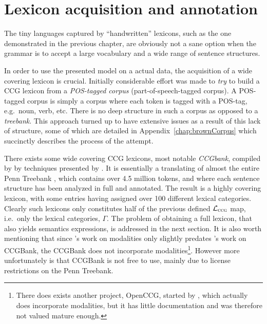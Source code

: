 
\chapter{Lexicon acquisition and annotation}
\label{chap:lexiconAcquisition}
The tiny languages captured by ``handwritten'' lexicons, such as the one demonstrated in the previous chapter, are obviously not a sane option when the grammar is to accept a large vocabulary and a wide range of sentence structures.

In order to use the presented model on a actual data, the acquisition of a wide covering lexicon is crucial. Initially considerable effort was made to \emph{try} to build a CCG lexicon from a \emph{POS-tagged corpus} (part-of-speech-tagged corpus). A POS-tagged corpus is simply a corpus where each token is tagged with a POS-tag, e.g.\ noun, verb, etc. There is no deep structure in such a corpus as opposed to a \emph{treebank}. This approach turned up to have extensive issues as a result of this lack of structure, some of which are detailed in Appendix~\ref{chap:brownCorpus} which succinctly describes the process of the attempt.

There exists some wide covering CCG lexicons, most notable \emph{CCGbank}, compiled by \citeauthor{ccgBank}  by techniques presented by \cite{juliaThesis}. It is essentially a translating of almost the entire Penn Treebank \cite{pennTreebank}, which contains over 4.5 million tokens, and where each sentence structure has been analyzed in full and annotated. The result is a highly covering lexicon, with some entries having assigned over 100 different lexical categories. Clearly such lexicons only constitutes half of the previous defined $\mathcal{L}_\textsc{ccg}$ map, i.e.\ only the lexical categories, $\Gamma$. The problem of obtaining a full lexicon, that also yields semantics expressions, is addressed in the next section. It is also worth mentioning that since \citeauthor{baldridgeThesis}'s  work on modalities only slightly predates \citeauthor{juliaThesis}'s  work on CCGBank, the CCGBank does not incorporate modalities\footnote{There does exists another project, OpenCCG, started by \citeauthor{baldridgeThesis}, which actually does incorporate modalities, but it has little documentation and was therefore not valued mature enough.}. However more unfortunately is that CCGBank is not free to use, mainly due to license restrictions on the Penn Treebank.%

